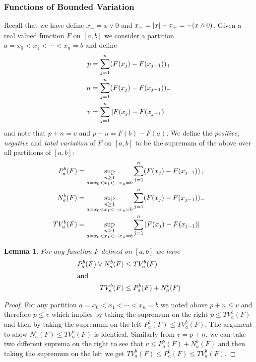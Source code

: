 \documentclass{amsart}
\newtheorem{lem}[thm]{Lemma}
\theoremstyle{remark}
\theoremstyle{definition}
\begin{document}
\subsubsection{Functions of Bounded Variation}
Recall that we have define $x_+ = x \vee 0$ and $x_- = \left \vert x \right \vert -
x_+ = -(x \wedge 0)$.  Given a real valued function $F$ on $[a,b]$ we consider a partition $a=x_0
< x_1 < \dotsb < x_n=b$ and define 
\begin{align*}
p &= \sum_{j=1}^n (F(x_j) - F(x_{j-1}))_+ \\
n &= \sum_{j=1}^n (F(x_j) - F(x_{j-1}))_- \\
v &= \sum_{j=1}^n \left \vert F(x_j) - F(x_{j-1}) \right \vert\\
\end{align*}
and note that $p+n = v$ and $p - n = F(b) - F(a)$.  We define the
\emph{positive}, \emph{negative} and \emph{total variation} of $F$ on
$[a,b]$ to be the supremum of the above over all partitions of
$[a,b]$:
\begin{align*}
P_a^b(F) &= \sup_{\substack{n \geq 1 \\ a=x_0 < x_1 < \dotsb x_n=b}} \sum_{j=1}^n (F(x_j) - F(x_{j-1}))_+ \\
N_a^b(F) &= \sup_{\substack{n \geq 1 \\ a=x_0 < x_1 < \dotsb x_n=b}} \sum_{j=1}^n (F(x_j) - F(x_{j-1}))_- \\
TV_a^b(F) &= \sup_{\substack{n \geq 1 \\ a=x_0 < x_1 < \dotsb x_n=b}} \sum_{j=1}^n \left \vert F(x_j) - F(x_{j-1}) \right \vert\\
\end{align*}


\begin{lem}\label{ElementaryVariationInequalities}For any function $F$ defined on $[a,b]$ we have 
\begin{align*}
P_a^b(F) \vee N_a^b(F) &\leq TV_a^b(F) \\
\intertext{and}
TV_a^b(F) &\leq P_a^b(F) + N_a^b(F)
\end{align*}
\end{lem}
\begin{proof}
For any partition $a=x_0 < x_1 < \dotsb < x_n=b$ we noted above $p + n
\leq v$ and therefore $p \leq v$ which implies by taking the supremum on
the right $p \leq TV_a^b(F)$ and then by taking the supremum on the
left $P_a^b(F) \leq TV_a^b(F)$.  The argument to show $N_a^b(F) \leq
TV_a^b(F)$ is identical.  Similarly from $v = p + n$, we can take two
different suprema on the right to see that $v \leq P_a^b(F) +
N_a^b(F)$ and then taking the supremum on the left we get $TV_a^b(F)
\leq P_a^b(F) \leq TV_a^b(F)$.
\end{proof}
\end{document}

